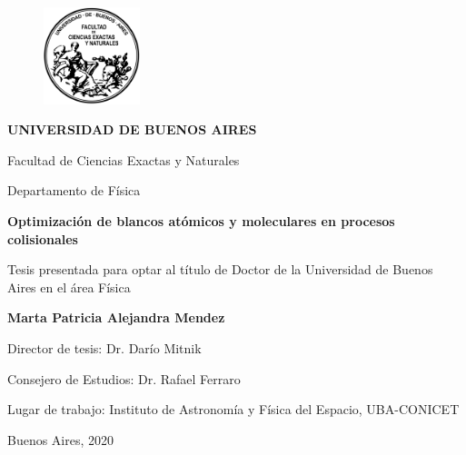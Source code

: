 \begin{titlepage}
\begin{center}

\begin{figure}[htb]
\centering
\includegraphics[width=0.25\textwidth]{figures/logofcenuba.png}
\end{figure}

\vspace{0.2cm}
\textbf{UNIVERSIDAD DE BUENOS AIRES}

\vspace{0.2cm}
Facultad de Ciencias Exactas y Naturales

\vspace{0.2cm}
Departamento de Física

\vspace{1.75cm}
\begin{Large}
\textbf{Optimización de blancos atómicos y moleculares en 
procesos colisionales} \\
\end{Large}

\vspace{1cm}
Tesis presentada para optar al título de Doctor de la Universidad de 
Buenos Aires en el área Física

\vspace{1.5cm}
\textbf{Marta Patricia Alejandra Mendez}\\
\end{center}

\vspace{1.25cm}
\noindent
Director de tesis: Dr. Darío Mitnik

\vspace{0.2cm}
\noindent
Consejero de Estudios: Dr. Rafael Ferraro

\vspace{0.75cm}
\noindent
Lugar de trabajo: Instituto de Astronomía y Física del Espacio, UBA-CONICET

\vspace{1.5cm}
\noindent
Buenos Aires, 2020

\end{titlepage}
\restoregeometry
